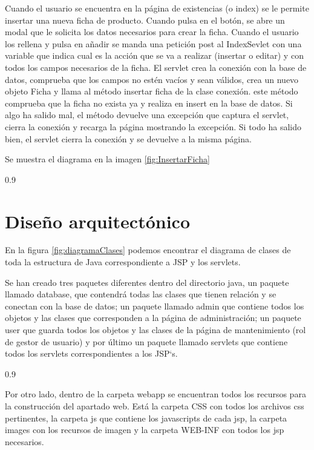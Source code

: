 Cuando el usuario se encuentra en la página de existencias (o index) se le permite insertar una nueva ficha de producto. Cuando pulsa en el botón, se abre un modal que le solicita los datos necesarios para crear la ficha. Cuando el usuario los rellena y pulsa en añadir se manda una petición post al IndexSevlet con una variable que indica cual es la acción que se va a realizar (insertar o editar) y con todos los campos necesarios de la ficha. El servlet crea la conexión con la base de datos, comprueba que los campos no estén vacíos y sean válidos, crea un nuevo objeto Ficha y llama al método insertar ficha de la clase conexión. este método comprueba que la ficha no exista ya y realiza en insert en la base de datos. Si algo ha salido mal, el método devuelve una excepción que captura el servlet, cierra la conexión y recarga la página mostrando la excepción. Si todo ha salido bien, el servlet  cierra la conexión y se devuelve a la misma página.

Se muestra el diagrama en la imagen \ref{fig:InsertarFicha}

 {0.9}

 
\section{Diseño arquitectónico}

En la figura \ref{fig:diagramaClases} podemos encontrar el diagrama de clases de toda la estructura de Java correspondiente a JSP y los servlets.

Se han creado tres paquetes diferentes dentro del directorio java, un paquete llamado database, que contendrá todas las clases que tienen relación y se conectan con la base de datos; un paquete llamado admin que contiene todos los objetos y las clases que corresponden a la página de administración; un paquete user que guarda todos los objetos y las clases de la página de mantenimiento (rol de gestor de usuario) y por último un paquete llamado servlets que contiene todos los servlets correspondientes a los JSP`s.

 {0.9}


Por otro lado, dentro de la carpeta webapp se encuentran todos los recursos para la construcción del apartado web. Está la carpeta CSS con todos los archivos css pertinentes, la carpeta js que contiene los javascripts de cada jsp, la carpeta images con los recursos de imagen y la carpeta WEB-INF con todos los jsp necesarios.



